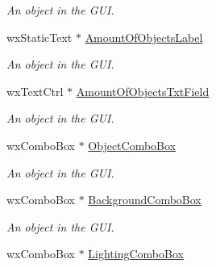 \begin{DoxyCompactItemize}
\begin{DoxyCompactList}\small\item\em An object in the GUI. \item\end{DoxyCompactList}\item 
\hypertarget{classGUIFrame_adabeefcf492345cc52af39de8399f0a4}{
wxStaticText $\ast$ \hyperlink{classGUIFrame_adabeefcf492345cc52af39de8399f0a4}{AmountOfObjectsLabel}}
\label{classGUIFrame_adabeefcf492345cc52af39de8399f0a4}

\begin{DoxyCompactList}\small\item\em An object in the GUI. \item\end{DoxyCompactList}\item 
\hypertarget{classGUIFrame_a556f08321d7a15820a4573ba53801cae}{
wxTextCtrl $\ast$ \hyperlink{classGUIFrame_a556f08321d7a15820a4573ba53801cae}{AmountOfObjectsTxtField}}
\label{classGUIFrame_a556f08321d7a15820a4573ba53801cae}

\begin{DoxyCompactList}\small\item\em An object in the GUI. \item\end{DoxyCompactList}\item 
\hypertarget{classGUIFrame_a500bc0bbeedcce21e063960f9cd805c8}{
wxComboBox $\ast$ \hyperlink{classGUIFrame_a500bc0bbeedcce21e063960f9cd805c8}{ObjectComboBox}}
\label{classGUIFrame_a500bc0bbeedcce21e063960f9cd805c8}

\begin{DoxyCompactList}\small\item\em An object in the GUI. \item\end{DoxyCompactList}\item 
\hypertarget{classGUIFrame_af5f2b70daa88e94a827c0ba2e8be503c}{
wxComboBox $\ast$ \hyperlink{classGUIFrame_af5f2b70daa88e94a827c0ba2e8be503c}{BackgroundComboBox}}
\label{classGUIFrame_af5f2b70daa88e94a827c0ba2e8be503c}

\begin{DoxyCompactList}\small\item\em An object in the GUI. \item\end{DoxyCompactList}\item 
\hypertarget{classGUIFrame_ae9991347c83a3ebe541afab55e5405b7}{
wxComboBox $\ast$ \hyperlink{classGUIFrame_ae9991347c83a3ebe541afab55e5405b7}{LightingComboBox}}
\label{classGUIFrame_ae9991347c83a3ebe541afab55e5405b7}


\end{DoxyCompactItemize}
